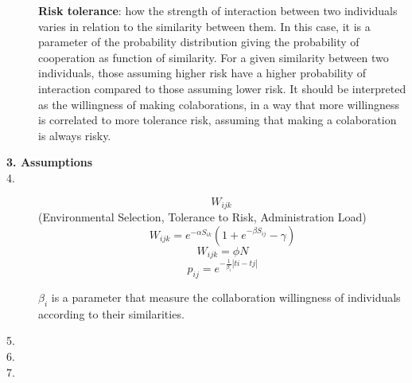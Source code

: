 \documentclass[12pt,a4paper]{article}
\begin{document}
\begin{description}
\textbf{Risk tolerance}: how the strength of interaction between two individuals varies in relation to the similarity between them. 
In this case, it is a parameter of the probability distribution giving the probability of cooperation as function of similarity.
For a given similarity between two individuals, those assuming higher risk have a higher probability of interaction compared to those assuming lower risk.
It should be interpreted as the willingness of making colaborations, in a way that more willingness is correlated to more tolerance risk, assuming that making a colaboration is always risky.



\item[\textbf{3. Assumptions}] \hfill


\item[4.]
$$ W_{ijk} ~ $$ (Environmental Selection, Tolerance to Risk, Administration Load)
$$ W_{ijk} = e^{-\alpha S_{ik}}(1+e^{-\beta S_{ij}} - \gamma)$$
$$ W_{ijk} = \phi N$$
$$ p_{ij} = e^{- \frac{1}{\beta_i}| t{i} - t{j}|}$$

$\beta_i$ is a parameter that measure the collaboration willingness of individuals according to their similarities.
\item[5.]

\item[6.]

\item[7.]

 \end{description}
\end{document}
